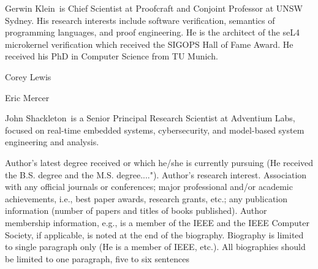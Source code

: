 \begin{IEEEbiography}{Gerwin Klein}{\,}
is Chief Scientist at Proofcraft and Conjoint Professor at UNSW Sydney. His
research interests include software verification, semantics of programming
languages, and proof engineering. He is the architect of the seL4 microkernel
verification which received the SIGOPS Hall of Fame Award. He received his PhD
in Computer Science from TU Munich.
\end{IEEEbiography}

\begin{IEEEbiography}{Corey Lewis}{\,}
\end{IEEEbiography}

\begin{IEEEbiography}{Eric Mercer}{\,}
\end{IEEEbiography}

\begin{IEEEbiography}{John Shackleton}{\,}
  is a Senior Principal Research Scientist at Adventium Labs,
  focused on real-time embedded systems, cybersecurity, and
  model-based system engineering and analysis.
\end{IEEEbiography}

Author's latest degree received or which he/she is currently pursuing
(He received the B.S. degree and the M.S. degree...."). Author's
research interest. Association with any official journals or
conferences; major professional and/or academic achievements, i.e.,
best paper awards, research grants, etc.; any publication information
(number of papers and titles of books published). Author membership
information, e.g., is a member of the IEEE and the IEEE Computer
Society, if applicable, is noted at the end of the
biography. Biography is limited to single paragraph only (He is a
member of IEEE, etc.). All biographies should be limited to one
paragraph, five to six sentences
